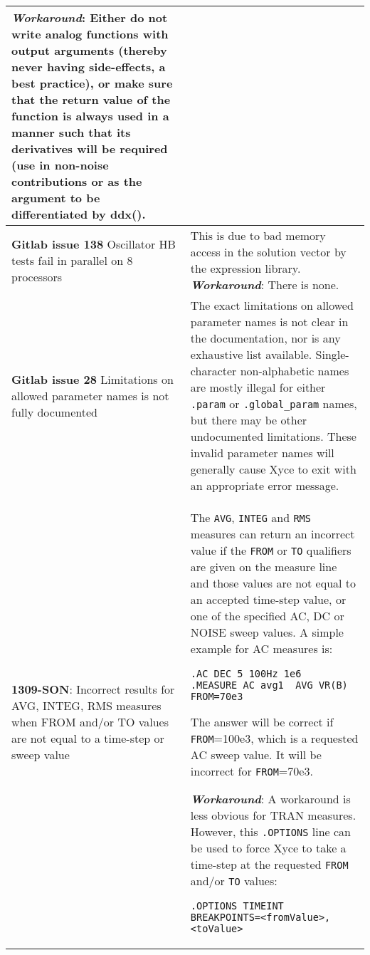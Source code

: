 {\begin{longtable}[h] {>{\raggedright\small}m{2in}|>{\raggedright\let\\\tabularnewline\small}m{3.5in}}
\textbf{\textit{Workaround}}:
Either do not write analog functions with output arguments (thereby
never having side-effects, a best practice), or make sure that the
return value of the function is always used in a manner such that its
derivatives will be required (use in non-noise contributions or as
the argument to be differentiated by ddx().

\\ \hline

\textbf{Gitlab issue 138} Oscillator HB tests fail in parallel on 8 processors &
This is due to bad memory access in the solution vector by the
expression library.
\textbf{\textit{Workaround}}:
There is none.
\\ \hline

\textbf{Gitlab issue 28} Limitations on allowed parameter names is not fully documented &
The exact limitations on allowed parameter names is not clear in the
documentation, nor is any exhaustive list available.  Single-character
non-alphabetic names are mostly illegal for either \texttt{.param}
or \texttt{.global\_param} names, but there may be other undocumented
limitations.  These invalid parameter names will generally cause Xyce
to exit with an appropriate error message.  \\ \hline

\textbf{1309-SON}: Incorrect results for AVG, INTEG, RMS measures when FROM
and/or TO values are not equal to a time-step or sweep value &
The \texttt{AVG},
\texttt{INTEG} and \texttt{RMS} measures can return an incorrect value if
the \texttt{FROM} or \texttt{TO} qualifiers are given on the measure line
and those values are not equal to an accepted time-step value, or one of
the specified AC, DC or NOISE sweep values.  A simple example for AC measures
is:
\begin{verbatim}
.AC DEC 5 100Hz 1e6
.MEASURE AC avg1  AVG VR(B) FROM=70e3
\end{verbatim}
The answer will be correct if \texttt{FROM}=100e3, which is a requested
AC sweep value. It will be incorrect for \texttt{FROM}=70e3.

\textbf{\textit{Workaround}}:
A workaround is less obvious for TRAN measures.  However,
this \texttt{.OPTIONS} line can be used to force Xyce to take a
time-step at the requested \texttt{FROM} and/or \texttt{TO} values:
\begin{verbatim}
.OPTIONS TIMEINT BREAKPOINTS=<fromValue>, <toValue>
\end{verbatim}
\\ \hline


\end{longtable}}
